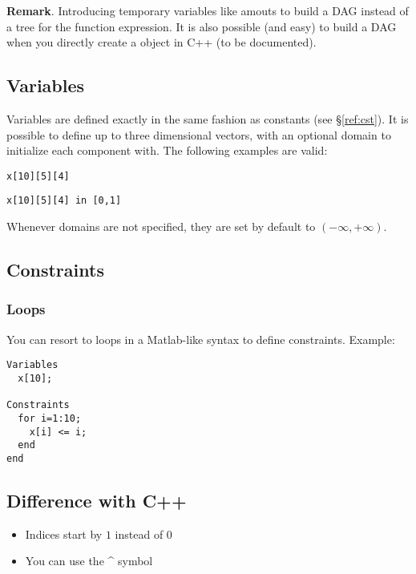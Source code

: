{\bf Remark}. Introducing temporary variables like  amouts to build a DAG instead of
a tree for the function expression. It is also possible (and easy) to build a DAG when you directly create
a  object in C++ (to be documented).

\subsection{Variables}

Variables are defined exactly in the same fashion as constants (see \S\ref{ref:cst}).
It is possible to define up to three dimensional vectors, with an optional domain to initialize each
component with. The following examples are valid:

{\tt x[10][5][4]}

{\tt x[10][5][4] in [0,1]}

Whenever domains are not specified, they are set by default to $(-\infty,+\infty)$.

\subsection{Constraints}
\subsubsection{Loops}

You can resort to loops in a Matlab-like syntax to define constraints. Example:

\begin{verbatim}
Variables
  x[10];

Constraints
  for i=1:10;
    x[i] <= i;
  end
end
\end{verbatim}

\subsection{Difference with C++}

\begin{itemize}
\item Indices start by $1$ instead of $0$
\item You can use the \^{} symbol
\end{itemize}

